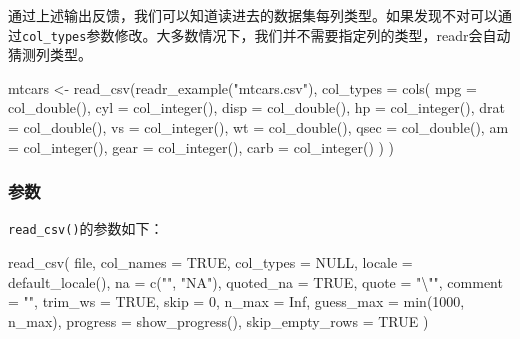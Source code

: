 \documentclass[
]{book}
\newenvironment{Shaded}{\begin{snugshade}}{\end{snugshade}}
\newcommand{\AttributeTok}[1]{\textcolor[rgb]{0.77,0.63,0.00}{#1}}
\newcommand{\ConstantTok}[1]{\textcolor[rgb]{0.00,0.00,0.00}{#1}}
\newcommand{\DecValTok}[1]{\textcolor[rgb]{0.00,0.00,0.81}{#1}}
\newcommand{\FunctionTok}[1]{\textcolor[rgb]{0.00,0.00,0.00}{#1}}
\newcommand{\NormalTok}[1]{#1}
\newcommand{\OtherTok}[1]{\textcolor[rgb]{0.56,0.35,0.01}{#1}}
\newcommand{\SpecialCharTok}[1]{\textcolor[rgb]{0.00,0.00,0.00}{#1}}
\newcommand{\StringTok}[1]{\textcolor[rgb]{0.31,0.60,0.02}{#1}}
\begin{document}
通过上述输出反馈，我们可以知道读进去的数据集每列类型。如果发现不对可以通过\texttt{col\_types}参数修改。大多数情况下，我们并不需要指定列的类型，readr会自动猜测列类型。

\begin{Shaded}
\begin{Highlighting}[]
\NormalTok{mtcars }\OtherTok{\textless{}{-}} \FunctionTok{read\_csv}\NormalTok{(}\FunctionTok{readr\_example}\NormalTok{(}\StringTok{"mtcars.csv"}\NormalTok{), }\AttributeTok{col\_types =} 
  \FunctionTok{cols}\NormalTok{(}
    \AttributeTok{mpg =} \FunctionTok{col\_double}\NormalTok{(),}
    \AttributeTok{cyl =} \FunctionTok{col\_integer}\NormalTok{(),}
    \AttributeTok{disp =} \FunctionTok{col\_double}\NormalTok{(),}
    \AttributeTok{hp =} \FunctionTok{col\_integer}\NormalTok{(),}
    \AttributeTok{drat =} \FunctionTok{col\_double}\NormalTok{(),}
    \AttributeTok{vs =} \FunctionTok{col\_integer}\NormalTok{(),}
    \AttributeTok{wt =} \FunctionTok{col\_double}\NormalTok{(),}
    \AttributeTok{qsec =} \FunctionTok{col\_double}\NormalTok{(),}
    \AttributeTok{am =} \FunctionTok{col\_integer}\NormalTok{(),}
    \AttributeTok{gear =} \FunctionTok{col\_integer}\NormalTok{(),}
    \AttributeTok{carb =} \FunctionTok{col\_integer}\NormalTok{()}
\NormalTok{  )}
\NormalTok{)}
\end{Highlighting}
\end{Shaded}

\hypertarget{ux53c2ux6570}{%
\subsubsection{参数}\label{ux53c2ux6570}}

\texttt{read\_csv()}的参数如下：

\begin{Shaded}
\begin{Highlighting}[]
\FunctionTok{read\_csv}\NormalTok{(}
\NormalTok{  file,}
  \AttributeTok{col\_names =} \ConstantTok{TRUE}\NormalTok{,}
  \AttributeTok{col\_types =} \ConstantTok{NULL}\NormalTok{,}
  \AttributeTok{locale =} \FunctionTok{default\_locale}\NormalTok{(),}
  \AttributeTok{na =} \FunctionTok{c}\NormalTok{(}\StringTok{""}\NormalTok{, }\StringTok{"NA"}\NormalTok{),}
  \AttributeTok{quoted\_na =} \ConstantTok{TRUE}\NormalTok{,}
  \AttributeTok{quote =} \StringTok{"}\SpecialCharTok{\textbackslash{}"}\StringTok{"}\NormalTok{,}
  \AttributeTok{comment =} \StringTok{""}\NormalTok{,}
  \AttributeTok{trim\_ws =} \ConstantTok{TRUE}\NormalTok{,}
  \AttributeTok{skip =} \DecValTok{0}\NormalTok{,}
  \AttributeTok{n\_max =} \ConstantTok{Inf}\NormalTok{,}
  \AttributeTok{guess\_max =} \FunctionTok{min}\NormalTok{(}\DecValTok{1000}\NormalTok{, n\_max),}
  \AttributeTok{progress =} \FunctionTok{show\_progress}\NormalTok{(),}
  \AttributeTok{skip\_empty\_rows =} \ConstantTok{TRUE}
\NormalTok{)}
\end{Highlighting}
\end{Shaded}
\end{document}
